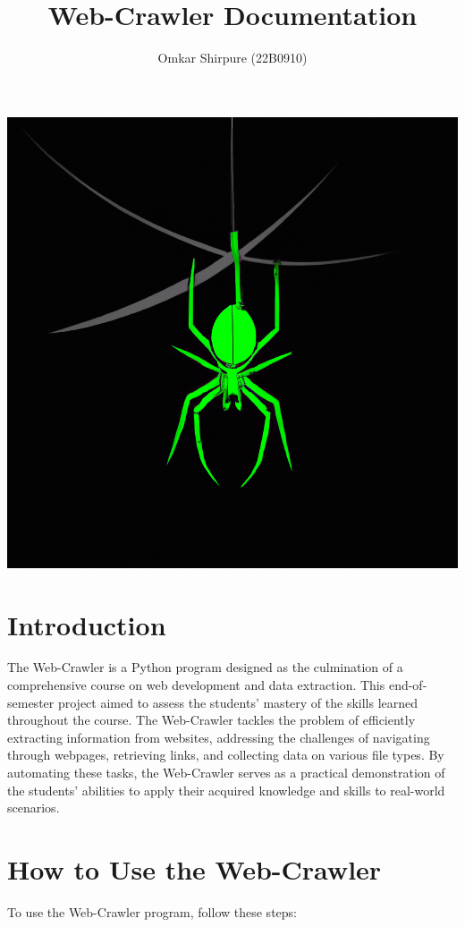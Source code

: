 \documentclass{article}
\title{\Huge\bfseries Web-Crawler Documentation}
\author{Omkar Shirpure (22B0910)}
\date{}
\begin{document}
\begin{titlingpage}
\maketitle
\vspace{2cm}
\centering
\includegraphics[width=0.6\linewidth]{spider.png}
\end{titlingpage}


\newpage

\tableofcontents

\newpage

\section{Introduction}
The Web-Crawler is a Python program designed as the culmination of a comprehensive course on web development and data extraction. This end-of-semester project aimed to assess the students' mastery of the skills learned throughout the course. The Web-Crawler tackles the problem of efficiently extracting information from websites, addressing the challenges of navigating through webpages, retrieving links, and collecting data on various file types. By automating these tasks, the Web-Crawler serves as a practical demonstration of the students' abilities to apply their acquired knowledge and skills to real-world scenarios.

\vspace{0.6in}
\section{How to Use the Web-Crawler}
To use the Web-Crawler program, follow these steps:
\end{document}
